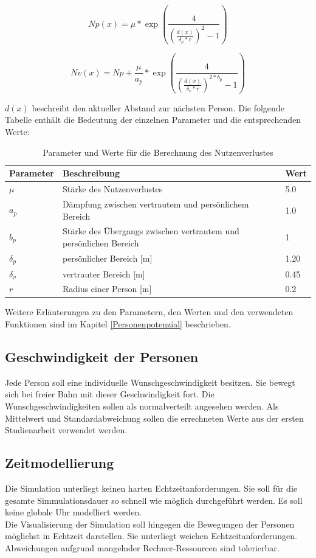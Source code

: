 \begin{equation}
\label{Equ:NutzenverlustP}
Np(x)= \mu * \exp(\frac{4}{(\frac{d(x)}{\delta_p * r})^{2} -1}) 
\end{equation}

\begin{equation}
\label{Equ:NutzenverlustV}
Nv(x)= Np + \frac{\mu}{a_p} * \exp(\frac{4}{(\frac{d(x)}{\delta_v * r})^{2*b_p} -1}) 
\end{equation}

$d(x)$ beschreibt den aktueller Abstand zur nächsten Person. Die folgende Tabelle enthält die Bedeutung der einzelnen Parameter und die entsprechenden Werte: 

\begin{table}[htpb]
	\centering
	\begin{tabular}{lll}
		Parameter & Beschreibung  &  Wert\\ \hline
		$\mu$ & Stärke des Nutzenverlustes & 5.0 \\
		$a_p$ & Dämpfung zwischen vertrautem und persönlichem Bereich & 1.0 \\
		$b_p$ & Stärke des Übergangs zwischen vertrautem und persönlichen Bereich &1 \\
		$\delta_p$ & persönlicher Bereich [m]& 1.20 \\
		$\delta_v$ & vertrauter Bereich [m]& 0.45 \\
		$r$ & Radius einer Person [m] & 0.2  
	\end{tabular}
	\caption{Parameter und Werte für die Berechnung des Nutzenverlustes}
	\label{tab:parameterNutzenverlust}
\end{table}

Weitere Erläuterungen zu den Parametern, den Werten und den verwendeten Funktionen sind im Kapitel \ref{Personenpotenzial} beschrieben.
 
\subsection{Geschwindigkeit der Personen}
Jede Person soll eine individuelle Wunschgeschwindigkeit besitzen. Sie bewegt sich bei freier Bahn mit dieser Geschwindigkeit fort. Die Wunschgeschwindigkeiten sollen als normalverteilt angesehen werden. Als Mittelwert und Standardabweichung sollen die errechneten Werte aus der ersten Studienarbeit verwendet werden.

\subsection{Zeitmodellierung}
Die Simulation unterliegt keinen harten Echtzeitanforderungen. Sie soll für die gesamte Simmulationsdauer so schnell wie möglich durchgeführt werden. Es soll keine globale Uhr modelliert werden. \\
Die Visualisierung der Simulation soll hingegen die Bewegungen der Personen möglichst in Echtzeit darstellen. Sie unterliegt weichen Echtzeitanforderungen. Abweichungen aufgrund mangelnder Rechner-Ressourcen sind tolerierbar. 


